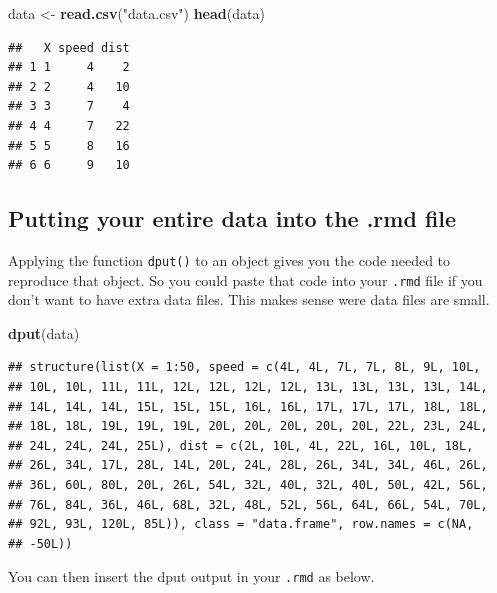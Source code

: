 \documentclass[12pt,]{article}
\newenvironment{Shaded}{\begin{snugshade}}{\end{snugshade}}
\newcommand{\KeywordTok}[1]{\textcolor[rgb]{0.13,0.29,0.53}{\textbf{#1}}}
\newcommand{\StringTok}[1]{\textcolor[rgb]{0.31,0.60,0.02}{#1}}
\newcommand{\NormalTok}[1]{#1}
\theoremstyle{definition}
\theoremstyle{definition}
\theoremstyle{definition}
\theoremstyle{remark}
\begin{document}
\begin{Shaded}
\begin{Highlighting}[]
\NormalTok{data <-}\StringTok{ }\KeywordTok{read.csv}\NormalTok{(}\StringTok{"data.csv"}\NormalTok{)}
\KeywordTok{head}\NormalTok{(data)}
\end{Highlighting}
\end{Shaded}

\begin{verbatim}
##   X speed dist
## 1 1     4    2
## 2 2     4   10
## 3 3     7    4
## 4 4     7   22
## 5 5     8   16
## 6 6     9   10
\end{verbatim}

\subsection{Putting your entire data into the .rmd
file}\label{putting-your-entire-data-into-the-.rmd-file}

Applying the function \texttt{dput()} to an object gives you the code
needed to reproduce that object. So you could paste that code into your
\texttt{.rmd} file if you don't want to have extra data files. This
makes sense were data files are small.

\begin{Shaded}
\begin{Highlighting}[]
\KeywordTok{dput}\NormalTok{(data)}
\end{Highlighting}
\end{Shaded}

\begin{verbatim}
## structure(list(X = 1:50, speed = c(4L, 4L, 7L, 7L, 8L, 9L, 10L, 
## 10L, 10L, 11L, 11L, 12L, 12L, 12L, 12L, 13L, 13L, 13L, 13L, 14L, 
## 14L, 14L, 14L, 15L, 15L, 15L, 16L, 16L, 17L, 17L, 17L, 18L, 18L, 
## 18L, 18L, 19L, 19L, 19L, 20L, 20L, 20L, 20L, 20L, 22L, 23L, 24L, 
## 24L, 24L, 24L, 25L), dist = c(2L, 10L, 4L, 22L, 16L, 10L, 18L, 
## 26L, 34L, 17L, 28L, 14L, 20L, 24L, 28L, 26L, 34L, 34L, 46L, 26L, 
## 36L, 60L, 80L, 20L, 26L, 54L, 32L, 40L, 32L, 40L, 50L, 42L, 56L, 
## 76L, 84L, 36L, 46L, 68L, 32L, 48L, 52L, 56L, 64L, 66L, 54L, 70L, 
## 92L, 93L, 120L, 85L)), class = "data.frame", row.names = c(NA, 
## -50L))
\end{verbatim}

You can then insert the dput output in your \texttt{.rmd} as below.
\end{document}
